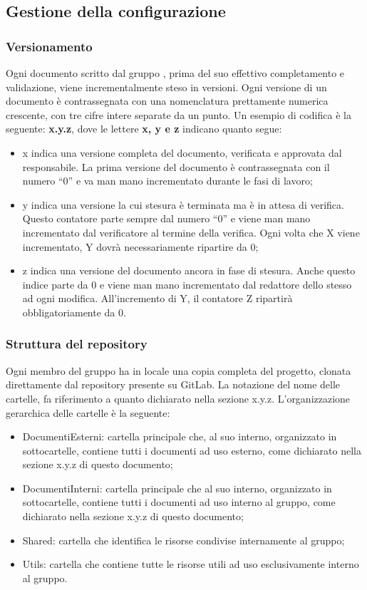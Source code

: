 \subsection{Gestione della configurazione}

\subsubsection{Versionamento}
Ogni documento scritto dal gruppo {\Gruppo}, prima del suo effettivo completamento e validazione, viene incrementalmente steso in versioni. Ogni versione di un documento è contrassegnata con una nomenclatura prettamente numerica crescente, con tre cifre intere separate da un punto. Un esempio di codifica è la seguente: \textbf{x.y.z}, dove le lettere \textbf{x, y e z} indicano quanto segue:
\begin{itemize}
	\item x indica una versione completa del documento, verificata e approvata dal responsabile. La prima versione del documento è contrassegnata con il numero “0” e va man mano incrementato durante le fasi di lavoro;
	\item y indica una versione la cui stesura è terminata ma è in attesa di verifica. Questo contatore parte sempre dal numero “0” e viene man mano incrementato dal verificatore al termine della verifica. Ogni volta che X viene incrementato, Y dovrà necessariamente ripartire da 0;
	\item z indica una versione del documento ancora in fase di stesura. Anche questo indice parte da 0 e viene man mano incrementato dal redattore dello stesso ad ogni modifica. All’incremento di Y, il contatore Z ripartirà obbligatoriamente da 0.
	\end{itemize}
\subsubsection{Struttura del repository}
Ogni membro del gruppo {\Gruppo} ha in locale una copia completa del progetto, clonata direttamente dal repository presente su GitLab. La notazione del nome delle cartelle, fa riferimento a quanto dichiarato nella sezione x.y.z. L’organizzazione gerarchica delle cartelle è la seguente:
\begin{itemize}
	\item DocumentiEsterni: cartella principale che, al suo interno, organizzato in sottocartelle, contiene tutti i documenti ad uso esterno, come dichiarato nella sezione x.y.z di questo documento;
	\item DocumentiInterni: cartella principale che al suo interno, organizzato in sottocartelle, contiene tutti i documenti ad uso interno al gruppo, come dichiarato nella sezione x.y.z di questo documento;
	\item Shared: cartella che identifica le risorse condivise internamente al gruppo;
	\item Utils: cartella che contiene tutte le risorse utili ad uso esclusivamente interno al gruppo.
\end{itemize}

